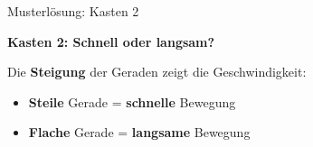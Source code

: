 \documentclass[aspectratio=169,11pt]{beamer}
\begin{document}
\begin{frame}{Musterlösung: Kasten 2}
    \begin{center}
        \begin{mlbox}
            \textbf{Kasten 2: Schnell oder langsam?}

            \vspace{0.5em}
            Die \textbf{Steigung} der Geraden zeigt die Geschwindigkeit:
            \begin{itemize}
                \item \textbf{Steile} Gerade = \textcolor{loesung}{\textbf{schnelle}} Bewegung
                \item \textbf{Flache} Gerade = \textcolor{loesung}{\textbf{langsame}} Bewegung
            \end{itemize}
        \end{mlbox}
    \end{center}
\end{frame}

\end{document}
